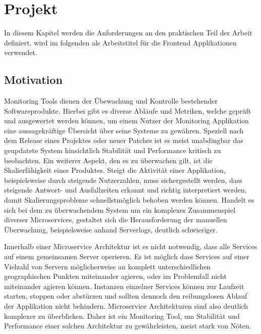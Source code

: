 
\chapter{Projekt \projectname{}}

In diesem Kapitel werden die Anforderungen an den praktischen Teil der Arbeit definiert.
\projectname{} wird im folgenden als Arbeitstitel für die Frontend Applikationen verwendet.

\section{Motivation}
\label{sec:motivation}

Monitoring Tools dienen der Übewachung und Kontrolle bestehender Softwareprodukte.
Hierbei gibt es diverse Abläufe und Metriken, welche geprüft und ausgewertet werden können, um einem Nutzer der Monitoring Applikation
eine aussagekräftige Übersicht über seine Systeme zu gewähren. Speziell nach dem Release eines Projektes oder neuer Patches
ist es meist unabdingbar das geupdatete System hinsichtlich Stabilität und Performance kritisch zu beobachten. Ein weiterer Aspekt, den es zu überwachen gilt,
ist die Skalierfähigkeit eines Produktes. Steigt die Aktivität einer Applikation, beispielsweise durch steigende Nutzerzahlen,
muss sichergestellt werden, dass steigende Antwort- und Ausfallzeiten erkannt und richtig interpretiert werden, damit Skalierungsprobleme schnellstmöglich behoben werden können.
Handelt es sich bei dem zu überwachendem System um ein komplexes Zusammenspiel diverser Microservices, gestaltet sich die Herausforderung der manuellen Überwachung, beispielsweise anhand
Serverlogs, deutlich schwieriger.

Innerhalb einer Microservice Architektur ist es nicht notwendig, dass alle Services auf einem gemeinsamen Server operieren.
Es ist möglich dass Services auf einer Vielzahl von Servern möglicherweise an komplett unterschiedlichen geographischen Punkten miteinander agieren,
oder im Problemfall nicht miteinander agieren können. Instanzen einzelner Services können zur Laufzeit starten, stoppen oder abstürzen
und sollten dennoch den reibungslosen Ablauf der Applikation nicht behindern. Microservice Architekturen sind also deutlich komplexer zu überblicken.
Daher ist ein Monitoring Tool, um Stabilität und Performance einer solchen Architektur zu gewährleisten, meist stark von Nöten.

\newpage

